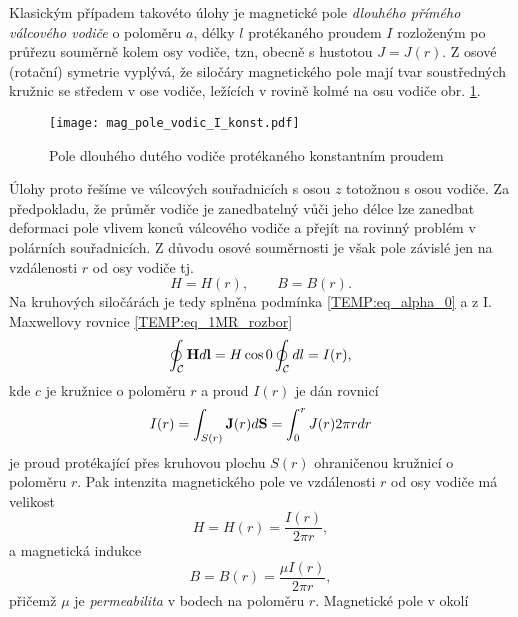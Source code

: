     Klasickým případem takovéto úlohy je magnetické pole \emph{dlouhého přímého válcového vodiče} o
    poloměru $a$, délky $l$ protékaného proudem $I$ rozloženým po průřezu souměrně kolem osy 
    vodiče, tzn, obecně s hustotou $J = J(r)$. Z osové (rotační) symetrie vyplývá, že siločáry 
    magnetického pole mají tvar soustředných kružnic se středem v ose vodiče, ležících v rovině 
    kolmé na osu vodiče obr. \ref{TEMP:fig_mag_pole_vodic_I_konst}.
    \begin{figure}[ht!]
      \centering
      \texttt{[image: mag\_pole\_vodic\_I\_konst.pdf]}
      \caption[Pole dlouhého dutého vodiče protékaného konstantním proudem]{Pole dlouhého dutého
               vodiče protékaného konstantním proudem}
      \label{TEMP:fig_mag_pole_vodic_I_konst}
    \end{figure}        
    Úlohy proto řešíme ve válcových souřadnicích s osou $z$ totožnou s osou vodiče. Za 
    předpokladu, že průměr vodiče je zanedbatelný vůči jeho délce lze zanedbat deformaci pole 
    vlivem konců válcového vodiče a přejít na rovinný problém v polárních souřadnicích. Z důvodu 
    osové  souměrnosti je však pole závislé jen na vzdálenosti $r$ od osy vodiče tj. $$H = H(r), 
    \qquad B = B(r).$$ Na kruhových siločárách je tedy splněna podmínka \ref{TEMP:eq_alpha_0} a z 
    I. Maxwellovy rovnice \ref{TEMP:eq_1MR_rozbor} 
      \begin{equation}\label{TEMP:eq_1MR_rozbor2}
        \oint_{\mathcal{C}}\mathbf{H}d\mathbf{l} = H\cos0\oint_{\mathcal{C}}dl = I(r),
      \end{equation}     
    kde $c$ je kružnice o poloměru $r$ a proud $I(r)$ je dán rovnicí
      \begin{equation}\label{TEMP:eq_1MR_Ir}
        I(r) = \int_{S(r)}\mathbf{J}(r)d\mathbf{S} = \int_0^rJ(r)2\pi rdr
      \end{equation}           
    je proud protékající přes kruhovou plochu $S(r)$ ohraničenou kružnicí o poloměru $r$. Pak
    intenzita magnetického pole ve vzdálenosti $r$ od osy vodiče má velikost
      \begin{equation}\label{TEMP:eq_Hr_vodice}
        H = H(r) = \frac{I(r)}{2\pi r},
      \end{equation}       
    a magnetická indukce 
      \begin{equation}\label{TEMP:eq_Br_vodice}
        B = B(r) = \frac{\mu I(r)}{2\pi r},
      \end{equation}       
    přičemž $\mu$ je \emph{permeabilita} v bodech na poloměru $r$. Magnetické pole v okolí
